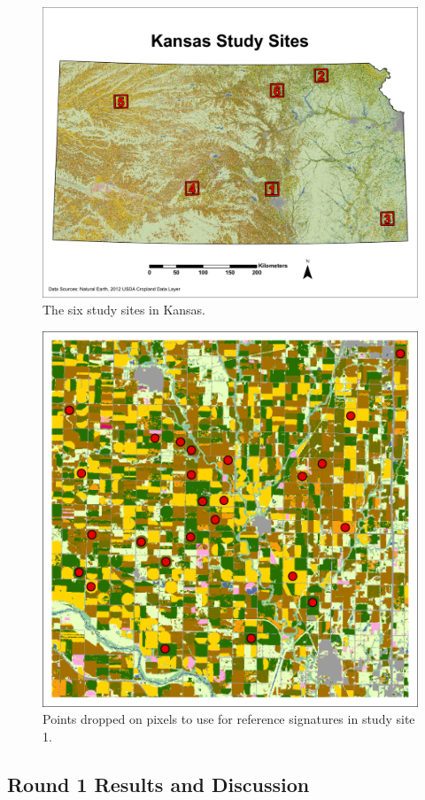 \begin{figure}
  \centering
  \includegraphics[width=.9\textwidth]{Graphics/Testing/STUDYSITES.pdf}
  \caption{The six study sites in Kansas.}
  \label{fig:studysites}
\end{figure}

\begin{figure}
  \centering
  \includegraphics[width=.7\textwidth]{Graphics/Testing/clip1_30mCDL_smpl_old.pdf}
  \caption{Points dropped on pixels to use for reference signatures in study site 1.}
  \label{fig:refpoints}
\end{figure}

\subsection*{Round 1 Results and Discussion}
\label{appendix:testing:r1:results}

